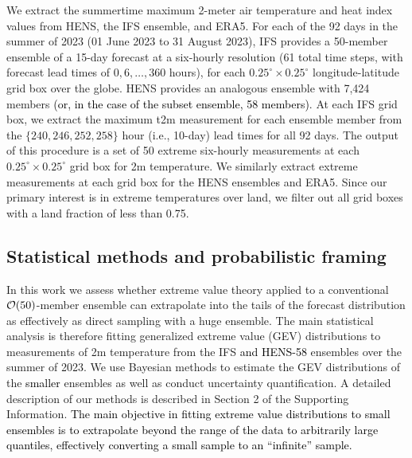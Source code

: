 \documentclass[draft]{agujournal2019}
\renewcommand{\st}[1]{\unskip}
\newcommand{\newTxt}{\textcolor{black}}
\begin{document}
We extract the summertime maximum 2-meter air temperature and heat index values from HENS, the IFS ensemble, and ERA5. For each of the 92 days in the summer of 2023 (01 June 2023 to 31 August 2023), IFS provides a 50-member ensemble of a 15-day forecast at a six-hourly resolution (61 total time steps, with forecast lead times of $0, 6, \dots, 360$ hours), for each $0.25^\circ \times 0.25^\circ$ longitude-latitude grid box over the globe.  HENS provides an analogous ensemble with 7,424 members \newTxt{(or, in the case of the subset ensemble, 58 members)}. %
At each IFS grid box, we extract the maximum t2m \st{and heat index} measurement for each ensemble member from the $\{240, 246, 252, 258\}$ hour (i.e., 10-day) lead times for all 92 days. %
The output of this procedure is a set of 50 extreme six-hourly measurements at each $0.25^\circ \times 0.25^\circ$ grid box for 2m temperature. \st{and the heat index.} We similarly extract extreme measurements at each grid box for the HENS ensemble\newTxt{s} and ERA5. Since our primary interest is in extreme temperatures over land, we filter out all grid boxes with a land fraction of less than 0.75. %

\subsection{Statistical methods and probabilistic framing}

In this work we assess whether extreme value theory applied to a conventional ${\cal{O}}(50)$-member ensemble can extrapolate into the tails of the forecast distribution as effectively as direct sampling with a huge ensemble.  The main statistical analysis is therefore fitting generalized extreme value (GEV) distributions to measurements of 2m temperature \st{and the heat index} from the IFS \newTxt{and HENS-58} ensembles over the summer of 2023. We use Bayesian methods to estimate the GEV distributions of the \st{IFS} \newTxt{smaller} ensembles as well as conduct uncertainty quantification. A detailed description of our methods is described in Section 2 of the Supporting Information. \newTxt{The main objective in fitting extreme value distributions to small ensembles is to extrapolate beyond the range of the data to arbitrarily large quantiles, effectively converting a small sample to an ``infinite'' sample.}
\end{document}
